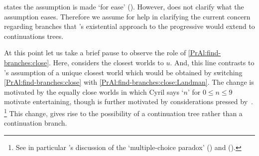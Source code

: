 \begin{note}
{    \citeauthor{Landman:1992wh} states the assumption is made `for ease' (\citeyear[26]{Landman:1992wh}).
    However, \citeauthor{Landman:1992wh} does not clarify what the assumption eases.
    Therefore we assume for help in clarifying the current concern regarding branches that \citeauthor{Landman:1992wh}'s existential approach to the progressive would extend to continuations trees.
  }
\end{note}

\begin{note}
  At this point let us take a brief pause to observe the role of \autoref{PrAl:find-branches:close}.
  Here, \AlgFindBranches{} considers the closest worlds to \(u\).
  And, this line contrasts to \citeauthor{Landman:1992wh}'s assumption of a unique closest world which would be obtained by switching \autoref{PrAl:find-branches:close} with \autoref{PrAl:find-branches:close:Landman}.
  The change is motivated by the equally close worlds in which Cyril says `\(n\)' for \(0 \leq n \leq 9\) motivate entertaining, though is further motivated by considerations pressed by~\textcite{Bonomi:1997uq}.%
  \footnote{
    See in particular \citeauthor{Bonomi:1997uq}'s discussion of the `multiple-choice paradox' (\citeyear[\S4]{Bonomi:1997uq}) and (\cite[37]{Szabo:2004ul}).
  }
  This change, gives rise to the possibility of a continuation tree rather than a continuation branch.
\end{note}

